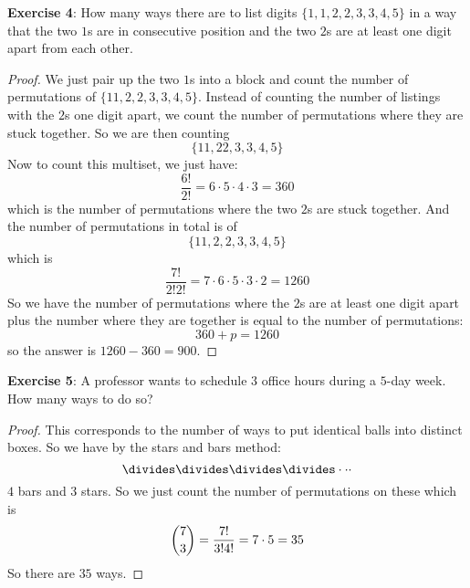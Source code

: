 \documentclass{article}
\begin{document}
\textbf{Exercise 4}: How many ways there are to list digits $\{1, 1, 2, 2, 3, 3, 4, 5\}$ in a way that the two $1$s are in consecutive position and the two $2$s are at least one digit apart from each other.
    \begin{proof}
        We just pair up the two $1$s into a block and count the number of permutations of $\{11, 2, 2, 3, 3, 4, 5\}$. Instead of counting the number of listings with the $2$s one digit apart, we count the number of permutations where they are stuck together. So we are then counting
            \begin{equation*}
                \{11, 22, 3, 3, 4, 5\}
            \end{equation*}
        Now to count this multiset, we just have:
            \begin{equation*}
                \dfrac{6!}{2!} = 6 \cdot 5 \cdot 4 \cdot 3 = 360
            \end{equation*}
        which is the number of permutations where the two $2$s are stuck together. And the number of permutations in total is of 
            \begin{equation*}
                \{11, 2, 2, 3, 3, 4, 5\}
            \end{equation*}
        which is 
            \begin{equation*}
                \dfrac{7!}{2!2!} = 7 \cdot 6 \cdot 5 \cdot 3 \cdot 2 = 1260
            \end{equation*}
        So we have the number of permutations where the $2$s are at least one digit apart plus the number where they are together is equal to the number of permutations:
            \begin{equation*}
                360 + p = 1260
            \end{equation*}
        so the answer is $1260 - 360 = 900$.
    \end{proof}

\textbf{Exercise 5}: A professor wants to schedule $3$ office hours during a $5$-day week. How many ways to do so?
    \begin{proof}
        This corresponds to the number of ways to put identical balls into distinct boxes. So we have by the stars and bars method:
            \begin{equation*}
                \divides \divides \divides \divides \cdot \cdot \cdot 
            \end{equation*}
        $4$ bars and $3$ stars. So we just count the number of permutations on these which is 
            \begin{equation*}
                \dbinom{7}{3} = \dfrac{7!}{3!4!} = 7 \cdot 5 = 35
            \end{equation*}
        So there are $35$ ways.
    \end{proof}
\end{document}
